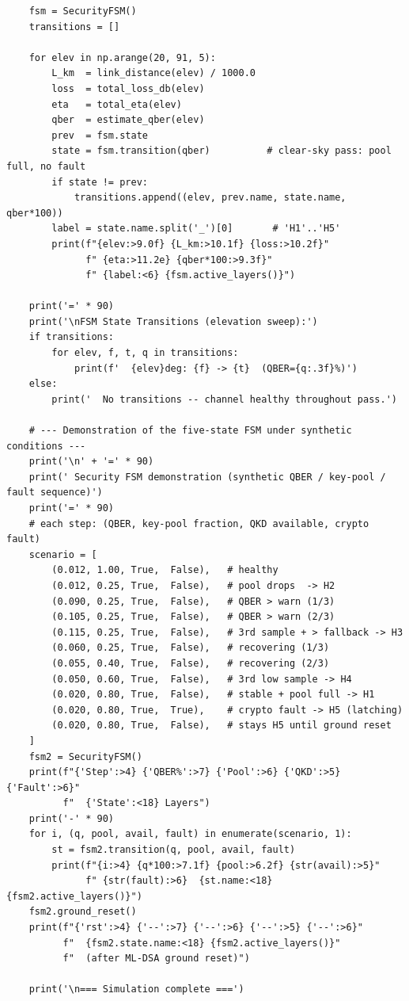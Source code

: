 \documentclass[a4paper,14pt]{extreport}
\begin{document}
\begin{latin}
\begin{verbatim}
    fsm = SecurityFSM()
    transitions = []

    for elev in np.arange(20, 91, 5):
        L_km  = link_distance(elev) / 1000.0
        loss  = total_loss_db(elev)
        eta   = total_eta(elev)
        qber  = estimate_qber(elev)
        prev  = fsm.state
        state = fsm.transition(qber)          # clear-sky pass: pool full, no fault
        if state != prev:
            transitions.append((elev, prev.name, state.name, qber*100))
        label = state.name.split('_')[0]       # 'H1'..'H5'
        print(f"{elev:>9.0f} {L_km:>10.1f} {loss:>10.2f}"
              f" {eta:>11.2e} {qber*100:>9.3f}"
              f" {label:<6} {fsm.active_layers()}")

    print('=' * 90)
    print('\nFSM State Transitions (elevation sweep):')
    if transitions:
        for elev, f, t, q in transitions:
            print(f'  {elev}deg: {f} -> {t}  (QBER={q:.3f}%)')
    else:
        print('  No transitions -- channel healthy throughout pass.')

    # --- Demonstration of the five-state FSM under synthetic conditions ---
    print('\n' + '=' * 90)
    print(' Security FSM demonstration (synthetic QBER / key-pool / fault sequence)')
    print('=' * 90)
    # each step: (QBER, key-pool fraction, QKD available, crypto fault)
    scenario = [
        (0.012, 1.00, True,  False),   # healthy
        (0.012, 0.25, True,  False),   # pool drops  -> H2
        (0.090, 0.25, True,  False),   # QBER > warn (1/3)
        (0.105, 0.25, True,  False),   # QBER > warn (2/3)
        (0.115, 0.25, True,  False),   # 3rd sample + > fallback -> H3
        (0.060, 0.25, True,  False),   # recovering (1/3)
        (0.055, 0.40, True,  False),   # recovering (2/3)
        (0.050, 0.60, True,  False),   # 3rd low sample -> H4
        (0.020, 0.80, True,  False),   # stable + pool full -> H1
        (0.020, 0.80, True,  True),    # crypto fault -> H5 (latching)
        (0.020, 0.80, True,  False),   # stays H5 until ground reset
    ]
    fsm2 = SecurityFSM()
    print(f"{'Step':>4} {'QBER%':>7} {'Pool':>6} {'QKD':>5} {'Fault':>6}"
          f"  {'State':<18} Layers")
    print('-' * 90)
    for i, (q, pool, avail, fault) in enumerate(scenario, 1):
        st = fsm2.transition(q, pool, avail, fault)
        print(f"{i:>4} {q*100:>7.1f} {pool:>6.2f} {str(avail):>5}"
              f" {str(fault):>6}  {st.name:<18} {fsm2.active_layers()}")
    fsm2.ground_reset()
    print(f"{'rst':>4} {'--':>7} {'--':>6} {'--':>5} {'--':>6}"
          f"  {fsm2.state.name:<18} {fsm2.active_layers()}"
          f"  (after ML-DSA ground reset)")

    print('\n=== Simulation complete ===')
\end{verbatim}
\end{latin}
\end{document}

